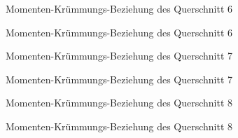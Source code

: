 \documentclass[
  11pt,
  letterpaper,
]{scrreprt}
\begin{document}
\begin{figure}[H]


\caption{\label{fig-qs_6}Momenten-Krümmungs-Beziehung des Querschnitt 6}

\end{figure}%

\begin{figure}[H]


\caption{\label{fig-m_chi_6}Momenten-Krümmungs-Beziehung des Querschnitt
6}

\end{figure}%

\begin{figure}[H]


\caption{\label{fig-qs_7}Momenten-Krümmungs-Beziehung des Querschnitt 7}

\end{figure}%

\begin{figure}[H]


\caption{\label{fig-m_chi_7}Momenten-Krümmungs-Beziehung des Querschnitt
7}

\end{figure}%

\begin{figure}[H]


\caption{\label{fig-qs_8}Momenten-Krümmungs-Beziehung des Querschnitt 8}

\end{figure}%

\begin{figure}[H]


\caption{\label{fig-m_chi_8}Momenten-Krümmungs-Beziehung des Querschnitt
8}

\end{figure}%
\end{document}
